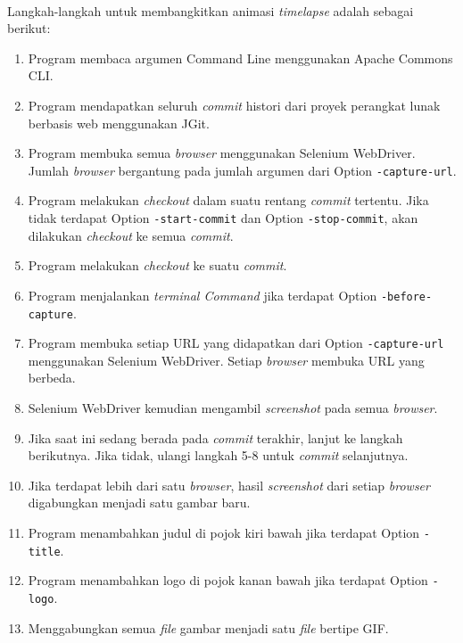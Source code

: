 \ \\

Langkah-langkah untuk membangkitkan animasi \textit{timelapse} adalah sebagai berikut:\\
\begin{enumerate}
\item Program membaca argumen Command Line menggunakan Apache Commons CLI.
\item Program mendapatkan seluruh \textit{commit} histori dari proyek perangkat lunak berbasis web menggunakan JGit.
\item Program membuka semua \textit{browser} menggunakan Selenium WebDriver. Jumlah \textit{browser} bergantung pada jumlah argumen dari Option \texttt{-capture-url}.
\item Program melakukan \textit{checkout} dalam suatu rentang \textit{commit} tertentu. Jika tidak terdapat Option \texttt{-start-commit} dan Option \texttt{-stop-commit}, akan dilakukan \textit{checkout} ke semua \textit{commit}.
\item Program melakukan \textit{checkout} ke suatu \textit{commit}. 
\item Program menjalankan \textit{terminal Command} jika terdapat Option \texttt{-before-capture}.
\item Program membuka setiap URL yang didapatkan dari Option \texttt{-capture-url} menggunakan Selenium WebDriver. Setiap \textit{browser} membuka URL yang berbeda.
\item Selenium WebDriver kemudian mengambil \textit{screenshot} pada semua \textit{browser}.
\item Jika saat ini sedang berada pada \textit{commit} terakhir, lanjut ke langkah berikutnya. Jika tidak, ulangi langkah 5-8 untuk \textit{commit} selanjutnya.
\item Jika terdapat lebih dari satu \textit{browser}, hasil \textit{screenshot} dari setiap \textit{browser} digabungkan menjadi satu gambar baru. 
\item Program menambahkan judul di pojok kiri bawah jika terdapat Option \texttt{-title}.
\item Program menambahkan logo di pojok kanan bawah jika terdapat Option \texttt{-logo}.  
\item Menggabungkan semua \textit{file} gambar menjadi satu \textit{file} bertipe GIF.
\end{enumerate}

